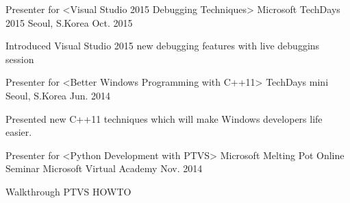 

\begin{cventries}

  \cventry
    {Presenter for <Visual Studio 2015 Debugging Techniques>} %
    {Microsoft TechDays 2015} %
    {Seoul, S.Korea} %
    {Oct. 2015} %
    {
      \begin{cvitems} %
        \item {Introduced Visual Studio 2015 new debugging features with live
    debuggins session}
      \end{cvitems}
    }

  \cventry
    {Presenter for <Better Windows Programming with C++11>} %
    {TechDays mini} %
    {Seoul, S.Korea} %
    {Jun. 2014} %
    {
      \begin{cvitems} %
        \item {Presented new C++11 techniques which will make Windows
    developers life easier.}
      \end{cvitems}
    }

  \cventry
    {Presenter for <Python Development with PTVS>} %
    {Microsoft Melting Pot Online Seminar} %
    {Microsoft Virtual Academy} %
    {Nov. 2014} %
    {
      \begin{cvitems} %
        \item {Walkthrough PTVS HOWTO}
      \end{cvitems}
    }

\end{cventries}
